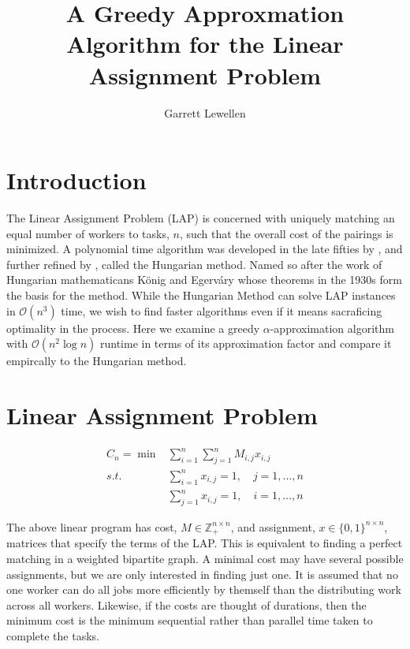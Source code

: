 \documentclass{article}
\newcommand{\boundedBy}[1]{\mathcal{O} \left ( #1 \right )}
\begin{document}
\author{Garrett Lewellen}
\title{A Greedy Approxmation Algorithm for the Linear Assignment Problem}

\maketitle

\section{Introduction}

The Linear Assignment Problem (LAP) is concerned with uniquely matching an equal number of workers to tasks, $n$, such that the overall cost of the pairings is minimized. A polynomial time algorithm was developed in the late fifties by \cite{kuhn1955hungarian}, and further refined by \cite{munkres1957algorithms}, called the Hungarian method. Named so after the work of Hungarian mathematicans K{\"o}nig and Egerv{\'a}ry whose theorems in the 1930s form the basis for the method. While the Hungarian Method can solve LAP instances in $\boundedBy{n^3}$ time, we wish to find faster algorithms even if it means sacraficing optimality in the process. Here we examine a greedy $\alpha$-approximation algorithm with $\boundedBy{n^2 \log n}$ runtime in terms of its approximation factor and compare it empircally to the Hungarian method.

\section{Linear Assignment Problem}

\begin{equation}
\begin{aligned}
	C_n = \min & \sum_{i=1}^{n} \sum_{j=1}^{n} M_{i,j} x_{i,j} \\
	s.t. & \sum_{i=1}^{n} x_{i,j} = 1, \quad j = 1, \ldots, n \\
	& \sum_{j=1}^{n} x_{i,j} = 1, \quad i = 1, \dots, n
	\label{eqn:lap}
\end{aligned}
\end{equation}

The above linear program has cost, $M \in \mathbb{Z}_{+}^{n \times n}$, and assignment, $x \in \lbrace 0,1 \rbrace^{n \times n}$, matrices that specify the terms of the LAP. This is equivalent to finding a perfect matching in a weighted bipartite graph. A minimal cost may have several possible assignments, but we are only interested in finding just one. It is assumed that no one worker can do all jobs more efficiently by themself than the distributing work across all workers. Likewise, if the costs are thought of durations, then the minimum cost is the minimum sequential rather than parallel time taken to complete the tasks.
\end{document}
